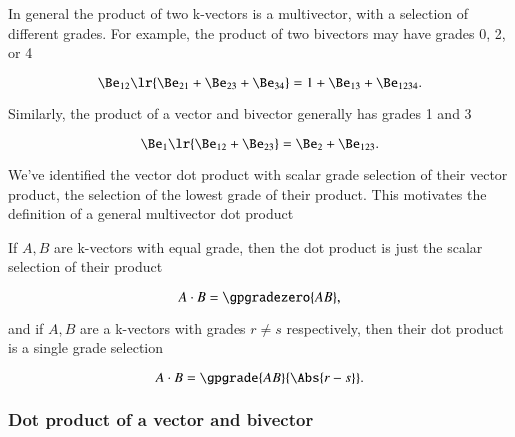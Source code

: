 %
%

In general the product of two k-vectors is a multivector, with a selection of different grades.
For example, the product of two bivectors may have grades 0, 2, or 4

\begin{dmath}\label{eqn:generalizedDot:601}
\Be_{12} \lr{ \Be_{21} + \Be_{23} + \Be_{34} }
=
1 + \Be_{13} + \Be_{1234}.
\end{dmath}

Similarly,
the product of a vector and bivector generally has grades 1 and 3

\begin{dmath}\label{eqn:generalizedDot:621}
\Be_1 \lr{ \Be_{12} + \Be_{23} }
=
\Be_2 + \Be_{123}.
\end{dmath}

We've identified the vector dot product with scalar grade selection of their vector product, the selection of the lowest grade of their product.
This motivates the definition of a general multivector dot product


If \( A, B \) are k-vectors with equal grade, then the dot product is just the scalar selection of their product

\begin{dmath}\label{eqn:generalizedDot:580}
A \cdot B = \gpgradezero{ A B },
\end{dmath}

and if \( A, B \) are a k-vectors with grades \( r \ne s \) respectively, then their dot product is a single grade selection

\begin{dmath}\label{eqn:generalizedDot:581}
A \cdot B = \gpgrade{ A B }{\Abs{r - s}}.
\end{dmath}

\subsubsection{Dot product of a vector and bivector}

